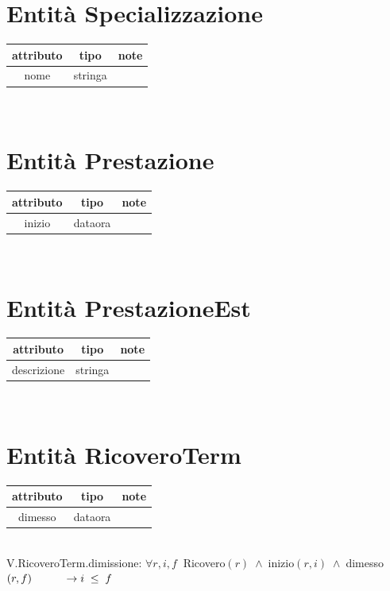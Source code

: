 \documentclass[a4paper,12pt]{report}
\begin{document}
      \section*{Entità Specializzazione}
        \begin{tabular}{|c|c|c|}
	        \hline attributo & tipo & note \\
	        \hline nome & stringa & \\
	        \hline
        \end{tabular} \\

      \section*{Entità Prestazione}
        \begin{tabular}{|c|c|c|}
	        \hline attributo & tipo & note \\
	        \hline inizio & dataora & \\
	        \hline
        \end{tabular} \\

      \section*{Entità PrestazioneEst}
        \begin{tabular}{|c|c|c|}
	        \hline attributo & tipo & note \\
	        \hline descrizione & stringa & \\
	        \hline
        \end{tabular} \\

      \section*{Entità RicoveroTerm}
        \begin{tabular}{|c|c|c|}
	        \hline attributo & tipo & note \\
	        \hline dimesso & dataora & \\
	        \hline
        \end{tabular} \\
        V.RicoveroTerm.dimissione: $\forall r,i,f\;\;$Ricovero$(r) \;\wedge\; $inizio$(r, i) \;\wedge\; $dimesso$(r, f) \\
        \hspace*{1cm}\rightarrow i \;\leq\; f$ \\
\end{document}
